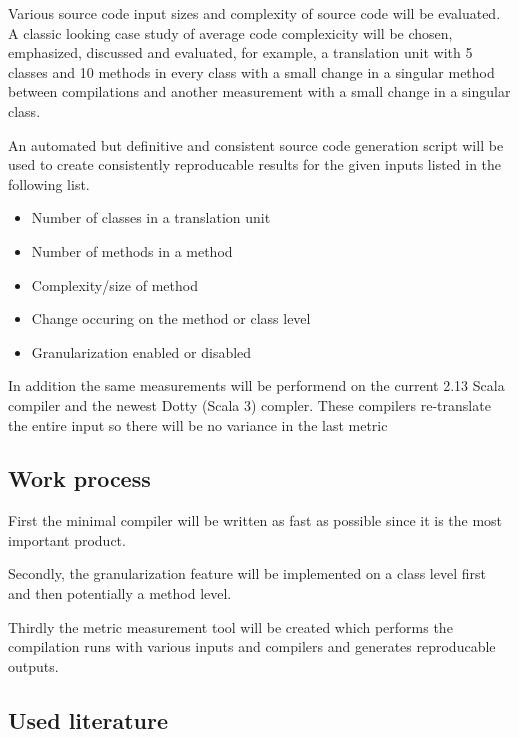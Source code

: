 \documentclass{VUMIFPSbakalaurinis}
\begin{document}
\begin{samepage}
Various source code input sizes and complexity of source code will be evaluated.
A classic looking case study of average code complexicity will be chosen, emphasized, discussed and evaluated, for example, a translation unit with 5 classes and 10 methods in every class with a small change in a singular method between compilations and another measurement with a small change in a singular class.

An automated but definitive and consistent source code generation script will be used to create consistently reproducable results for the given inputs listed in the following list.

\begin{itemize}
	\item Number of classes in a translation unit
	\item Number of methods in a method
	\item Complexity/size of method
	\item Change occuring on the method or class level
	\item Granularization enabled or disabled
\end{itemize}

In addition the same measurements will be performend on the current 2.13 Scala compiler and the newest Dotty (Scala 3) compler.
These compilers re-translate the entire input so there will be no variance in the last metric 

\subsection{Work process}
First the minimal compiler will be written as fast as possible since it is the most important product.

Secondly, the granularization feature will be implemented on a class level first and then potentially a method level.

Thirdly the metric measurement tool will be created which performs the compilation runs with various inputs and compilers and generates reproducable outputs.

\subsection{Used literature}
\end{samepage}

\printbibliography[heading=bibintoc]  %
\end{document}
